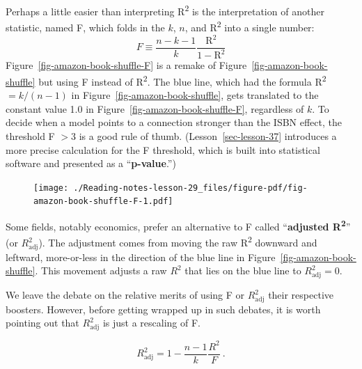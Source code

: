 \documentclass[
  letterpaper,
  DIV=11,
  numbers=noendperiod,
  oneside]{scrreprt}
\begin{document}
Perhaps a little easier than interpreting R\textsuperscript{2} is the
interpretation of another statistic, named F, which folds in the \(k\),
\(n\), and R\textsuperscript{2} into a single number:
\[F \equiv \frac{n-k-1}{k} \frac{\text{R}^2}{1 - \text{R}^2}\]
Figure~\ref{fig-amazon-book-shuffle-F} is a remake of
Figure~\ref{fig-amazon-book-shuffle} but using F instead of
R\textsuperscript{2}. The blue line, which had the formula
R\textsuperscript{2}\(= k/(n-1)\) in
Figure~\ref{fig-amazon-book-shuffle}, gets translated to the constant
value 1.0 in Figure~\ref{fig-amazon-book-shuffle-F}, regardless of
\(k\). To decide when a model points to a connection stronger than the
ISBN effect, the threshold F \(> 3\) is a good rule of thumb.
(Lesson~\ref{sec-lesson-37} introduces a more precise calculation for
the F threshold, which is built into statistical software and presented
as a ``\textbf{p-value}.'')

\begin{figure}


{\centering \texttt{[image: ./Reading-notes-lesson-29\_files/figure-pdf/fig-amazon-book-shuffle-F-1.pdf]}

}

\end{figure}

\begin{tcolorbox}[enhanced jigsaw, colbacktitle=quarto-callout-note-color!10!white, breakable, opacitybacktitle=0.6, colback=white, left=2mm, arc=.35mm, colframe=quarto-callout-note-color-frame, coltitle=black, toprule=.15mm, opacityback=0, leftrule=.75mm, bottomtitle=1mm, toptitle=1mm, titlerule=0mm, title=\textcolor{quarto-callout-note-color}{\faInfo}\hspace{0.5em}{Adjusted R\textsuperscript{2}}, rightrule=.15mm, bottomrule=.15mm]

Some fields, notably economics, prefer an alternative to F called
``\textbf{adjusted R\textsuperscript{2}}'' (or \(R^2_\text{adj}\)). The
adjustment comes from moving the raw R\textsuperscript{2} downward and
leftward, more-or-less in the direction of the blue line in
Figure~\ref{fig-amazon-book-shuffle}. This movement adjusts a raw
\(R^2\) that lies on the blue line to \(R^2_\text{adj} = 0\).

We leave the debate on the relative merits of using F or
\(R^2_\text{adj}\) their respective boosters. However, before getting
wrapped up in such debates, it is worth pointing out that
\(R^2_\text{adj}\) is just a rescaling of F.

\[R^2_\text{adj} = 1 - \frac{n-1}{k} \frac{R^2}{F}\ .\]

\end{tcolorbox}
\end{document}
